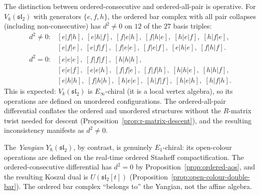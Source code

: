 \begin{remark}
\label{rem:sl2-d-squared-nonzero}
The distinction between ordered-consecutive and ordered-all-pair
is operative. For $V_k(\mathfrak{sl}_2)$ with generators
$\{e,f,h\}$, the ordered bar complex with all pair collapses
(including non-consecutive) has $d^2\ne 0$ on $12$ of the $27$
basis triples:
\[
\renewcommand{\arraystretch}{1.1}
\begin{array}{ll}
d^2\ne 0\colon & [e|f|h],\;[e|h|f],\;[f|e|h],\;
 [f|h|e],\;[h|e|f],\;[h|f|e], \\
 & [e|f|e],\;[e|f|f],\;[f|e|e],\;
 [f|e|f],\;[e|h|e],\;[f|h|f]. \\[4pt]
d^2=0\colon & [e|e|e],\;[f|f|f],\;[h|h|h], \\
 & [e|e|f],\;[e|e|h],\;[f|f|e],\;
 [f|f|h],\;[h|h|e],\;[h|h|f], \\
 & [e|h|h],\;[f|h|h],\;[h|e|e],\;
 [h|f|f],\;[h|e|h],\;[h|f|h].
\end{array}
\]
This is expected: $V_k(\mathfrak{sl}_2)$ is
$E_\infty$-chiral (it is a local vertex algebra), so its
operations are defined on unordered configurations. The
ordered-all-pair differential conflates the ordered and
unordered structures without the $R$-matrix twist
needed for descent
(Proposition~\ref{prop:r-matrix-descent}), and the
resulting inconsistency manifests as $d^2\ne 0$.

The \emph{Yangian} $Y_\hbar(\mathfrak{sl}_2)$, by contrast,
is genuinely $E_1$-chiral: its open-colour operations are defined on
the real-time ordered Stasheff compactification.
The ordered-consecutive differential has $d^2=0$ by
Proposition~\ref{prop:ordered-aos}, and the resulting
Koszul dual is $U(\mathfrak{sl}_2[t])$
(Proposition~\ref{prop:open-colour-double-bar}).
The ordered bar complex ``belongs to'' the Yangian, not
the affine algebra.
\end{remark}

